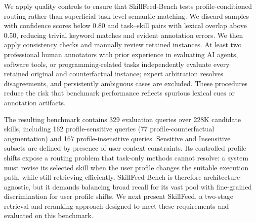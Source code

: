 \documentclass[letterpaper]{article} %
\begin{document}
We apply quality controls to ensure that SkillFeed-Bench tests profile-conditioned routing rather than superficial task level semantic matching. We discard samples with confidence scores below 0.80 and task--skill pairs with lexical overlap above 0.50, reducing trivial keyword matches and evident annotation errors. We then apply consistency checks and manually review retained instances. At least two professional human annotators with prior experience in evaluating AI agents, software tools, or programming-related tasks independently evaluate every retained original and counterfactual instance; expert arbitration resolves disagreements, and persistently ambiguous cases are excluded. These procedures reduce the risk that benchmark performance reflects spurious lexical cues or annotation artifacts.

The resulting benchmark contains 329 evaluation queries over 228K candidate skills, including 162 profile-sensitive queries (77 profile-counterfactual augmentation) and 167 profile-insensitive queries. Sensitive and Insensitive subsets are defined by
presence of user context constraints.
Its controlled profile shifts expose a routing problem that task-only methods cannot resolve: a system must revise its selected skill when the user profile changes the suitable execution path, while still retrieving efficiently. 
SkillFeed-Bench is therefore architecture-agnostic, but it demands balancing  broad recall for its vast pool with fine-grained discrimination for user profile shifts. We next present SkillFeed, a two-stage retrieval-and-reranking approach designed to meet these requirements and evaluated on this benchmark.
\end{document}
